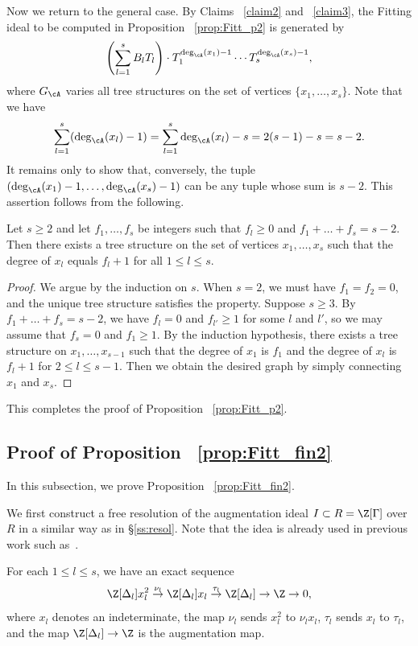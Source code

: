 Now we return to the general case.
By Claims ~\ref{claim2} and ~\ref{claim3}, the Fitting ideal to be computed in Proposition ~\ref{prop:Fitt_p2} is generated by
\[
\left(\sum_{l = 1}^s B_l T_l \right) \cdot T_1^{\deg_{\cA}(x_1)-1} \cdots T_s^{\deg_{\cA}(x_s) - 1},
\]
where $G_{\cA}$ varies all tree structures on the set of vertices $\{x_1, \dots, x_s \}$.
Note that we have
\[
\sum_{l=1}^s (\deg_{\cA}(x_l) - 1) 
= \sum_{l=1}^s \deg_{\cA}(x_l) - s
= 2(s-1) - s = s-2.
\]
It remains only to show that, conversely, the tuple $(\deg_{\cA}(x_1) - 1, \dots, \deg_{\cA}(x_s) - 1)$ can be any tuple whose sum is $s - 2$.
This assertion follows from the following.

\begin{claim}
Let $s \geq 2$ and let $f_1, \dots, f_s$ be integers such that $f_l \geq 0$ and $f_1 + \dots + f_s = s - 2$.
Then there exists a tree structure on the set of vertices $x_1, \dots, x_s$ such that the degree of $x_l$ equals $f_l + 1$ for all $1 \leq l \leq s$.
\end{claim}

\begin{proof}
We argue by the induction on $s$.
When $s = 2$, we must have $f_1 = f_2 = 0$, and the unique tree structure satisfies the property.
Suppose $s \geq 3$.
By $f_1 + \dots + f_s = s - 2$, we have $f_l = 0$ and $f_{l'} \geq 1$ for some $l$ and $l'$, so we may assume that $f_s = 0$ and $f_1 \geq 1$.
By the induction hypothesis, there exists a tree structure on $x_1, \dots, x_{s-1}$ such that the degree of $x_1$ is $f_1$ and the degree of $x_l$ is $f_l+1$ for $2 \leq l \leq s-1$.
Then we obtain the desired graph by simply connecting $x_1$ and $x_s$.
\end{proof}

This completes the proof of Proposition ~\ref{prop:Fitt_p2}.

\subsection{Proof of Proposition ~\ref{prop:Fitt_fin2}}\label{ss:thm2}

In this subsection, we prove Proposition ~\ref{prop:Fitt_fin2}.

We first construct a free resolution of the augmentation ideal $I \subset R = \Z[\Gamma]$ over $R$ in a similar way as in \S\ref{ss:resol}.
Note that the idea is already used in previous work such as~\cite{AK21}.

For each $1 \leq l \leq s$, we have an exact sequence
\[
\Z[\Delta_l] x_l^2 \overset{\nu_l}{\to} \Z[\Delta_l] x_l \overset{\tau_l}{\to} \Z[\Delta_l] \to \Z \to 0,
\]
where $x_l$ denotes an indeterminate, the map $\nu_l$ sends $x_l^2$ to $\nu_l x_l$, $\tau_l$ sends $x_l$ to $\tau_l$, and the map $\Z[\Delta_l] \to \Z$ is the augmentation map.

